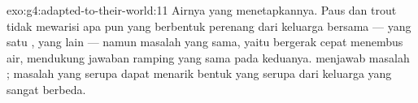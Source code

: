 \begin{solution}{exo:g4:adapted-to-their-world:11}
Airnya yang menetapkannya. Paus dan  trout tidak mewarisi apa pun
yang berbentuk perenang dari keluarga bersama --- yang satu ,
yang lain  --- namun masalah yang sama, yaitu bergerak cepat
menembus air, mendukung jawaban ramping yang sama pada keduanya.
 menjawab masalah ; masalah yang serupa dapat
menarik bentuk yang serupa dari keluarga yang sangat berbeda.
\end{solution}
